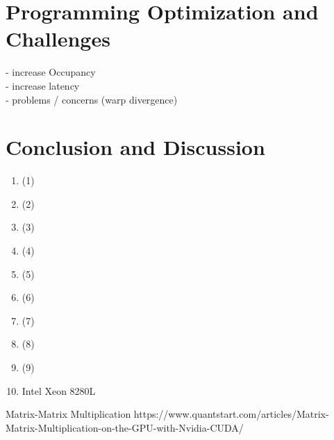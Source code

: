 \documentclass[a4paper,12pt]{llncs}
\numberwithin{equation}{section}
\begin{document}
\section{Programming Optimization and Challenges}
  - increase Occupancy\\
  - increase latency\\
  - problems / concerns (warp divergence)\\



\section{Conclusion and Discussion}

      


\begin{enumerate}
\item \cite{Rauber.2012} (1)
\item \cite{Lindholm.2008} (2)
\item \cite{Burgess.2020} (3)
\item \cite{Huang.2008} (4)
\item \cite{Bialas.2016} (5)
\item \cite{Khronos.2019} (6)
\item \cite{Wang.2019} (7)
\item \cite{NVIDIA.2018} (8)
\item \cite{NVIDIA.2019} (9)
\item Intel Xeon 8280L
\end{enumerate}

Matrix-Matrix Multiplication
https://www.quantstart.com/articles/Matrix-Matrix-Multiplication-on-the-GPU-with-Nvidia-CUDA/




\newpage



\end{document}
